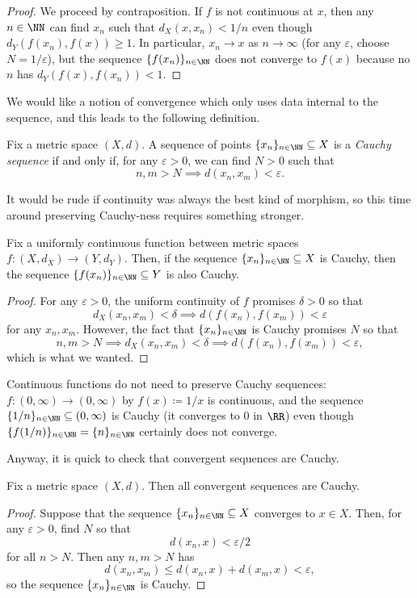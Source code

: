 \documentclass[../notes.tex]{subfiles}
\begin{document}
\begin{proof}
	We proceed by contraposition. If $f$ is not continuous at $x$, then any $n\in\NN$ can find $x_n$ such that $d_X(x,x_n)<1/n$ even though $d_Y(f(x_n),f(x))\ge1$. In particular, $x_n\to x$ as $n\to\infty$ (for any $\varepsilon$, choose $N=1/\varepsilon$), but the sequence $\{f(x_n)\}_{n\in\NN}$ does not converge to $f(x)$ because no $n$ has $d_Y(f(x),f(x_n))<1$.
\end{proof}
We would like a notion of convergence which only uses data internal to the sequence, and this leads to the following definition.
\begin{definition}[Cauchy]
	Fix a metric space $(X,d)$. A sequence of points $\{x_n\}_{n\in\NN}\subseteq X$ is a \textit{Cauchy sequence} if and only if, for any $\varepsilon>0$, we can find $N>0$ such that
	\[n,m>N\implies d(x_n,x_m)<\varepsilon.\]
\end{definition}
It would be rude if continuity was always the best kind of morphism, so this time around preserving Cauchy-ness requires something stronger.
\begin{lemma} \label{lem:uniformcontpreservecauchy}
	Fix a uniformly continuous function between metric spaces $f\colon(X,d_X)\to(Y,d_Y)$. Then, if the sequence $\{x_n\}_{n\in\NN}\subseteq X$ is Cauchy, then the sequence $\{f(x_n)\}_{n\in\NN}\subseteq Y$ is also Cauchy.
\end{lemma}
\begin{proof}
	For any $\varepsilon>0$, the uniform continuity of $f$ promises $\delta>0$ so that
	\[d_X(x_n,x_m)<\delta\implies d(f(x_n),f(x_m))<\varepsilon\]
	for any $x_n,x_m$. However, the fact that $\{x_n\}_{n\in\NN}$ is Cauchy promises $N$ so that
	\[n,m>N\implies d_X(x_n,x_m)<\delta\implies d(f(x_n),f(x_m))<\varepsilon,\]
	which is what we wanted.
\end{proof}
\begin{example}
	Continuous functions do not need to preserve Cauchy sequences: $f\colon(0,\infty)\to(0,\infty)$ by $f(x)\coloneqq 1/x$ is continuous, and the sequence $\{1/n\}_{n\in\NN}\subseteq(0,\infty)$ is Cauchy (it converges to $0$ in $\RR$) even though $\{f(1/n)\}_{n\in\NN}=\{n\}_{n\in\NN}$ certainly does not converge.
\end{example}
Anyway, it is quick to check that convergent sequences are Cauchy.
\begin{lemma}
	Fix a metric space $(X,d)$. Then all convergent sequences are Cauchy.
\end{lemma}
\begin{proof}
	Suppose that the sequence $\{x_n\}_{n\in\NN}\subseteq X$ converges to $x\in X$. Then, for any $\varepsilon>0$, find $N$ so that
	\[d(x_n,x)<\varepsilon/2\]
	for all $n>N$. Then any $n,m>N$ has
	\[d(x_n,x_m)\le d(x_n,x)+d(x_m,x)<\varepsilon,\]
	so the sequence $\{x_n\}_{n\in\NN}$ is Cauchy.
\end{proof}
\end{document}
